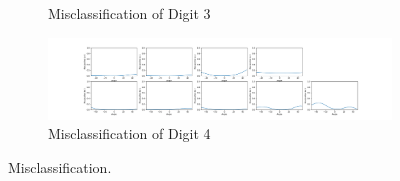 \begin{figure}[htb!]
\begin{subfigure}[b]{\textwidth}
        \caption{Misclassification of Digit 3}
        \label{fig:Rotate-misclass0}
    \end{subfigure}
    \begin{subfigure}[b]{ \textwidth}
        \centering
        \includegraphics[width=\textwidth]{chapters/results/CNN/Rotate/acc5.png}
        \caption{Misclassification of Digit 4}
        \label{fig:Rotate-misclass1}
    \end{subfigure}
    \caption{Misclassification.}
    \label{fig:Rotate-misclassifications}
\end{figure}

